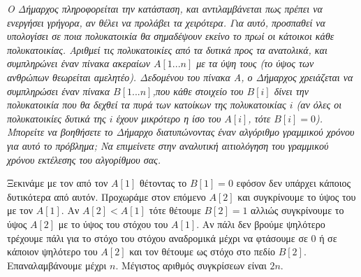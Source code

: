 \documentclass[a4paper,10pt]{article} \usepackage{anysize}
\begin{document}
\textit{Ο Δήμαρχος πληροφορείται την κατάσταση, και αντιλαμβάνεται πως πρέπει
να ενεργήσει γρήγορα, αν θέλει να προλάβει τα χειρότερα. Για αυτό, προσπαθεί
να υπολογίσει σε ποια πολυκατοικία θα σημαδέψουν εκείνο το πρωί οι κάτοικοι
κάθε πολυκατοικίας. Αριθμεί τις πολυκατοικίες από τα δυτικά προς τα ανατολικά,
και συμπληρώνει έναν πίνακα ακεραίων $A[1...n]$ με τα ύψη τους (το ύψος των
ανθρώπων θεωρείται αμελητέο). Δεδομένου του πίνακα Α, ο Δήμαρχος χρειάζεται να
συμπληρώσει έναν πίνακα $B[1...n]$,που κάθε στοιχείο του $B[i]$ δίνει την
πολυκατοικία που θα δεχθεί τα πυρά των κατοίκων της πολυκατοικίας $i$ (αν όλες
οι πολυκατοικίες δυτικά της $i$ έχουν μικρότερο η ίσο του $A[i]$, τότε
$B[i]=0$). Μπορείτε να βοηθήσετε το Δήμαρχο διατυπώνοντας έναν αλγόριθμο
γραμμικού χρόνου για αυτό το πρόβλημα; Να επιμείνετε στην αναλυτική
αιτιολόγηση του γραμμικού χρόνου εκτέλεσης του αλγορίθμου σας.} \vspace{0.4cm}

Ξεκινάμε με τον από τον $A[1]$ θέτοντας το $B[1]=0$ εφόσον δεν υπάρχει κάποιος
δυτικότερα από αυτόν. Προχωράμε στον επόμενο $A[2]$ και συγκρίνουμε το ύψος
του με τον $A[1]$. Αν $A[2]<A[1]$ τότε θέτουμε $B[2]=1$ αλλιώς συγκρίνουμε το
ύψος $A[2]$ με το ύψος του στόχου του $A[1]$. Αν πάλι δεν βρούμε ψηλότερο
τρέχουμε πάλι για το στόχο του στόχου αναδρομικά μέχρι να φτάσουμε σε 0
ή σε κάποιον ψηλότερο του $A[2]$ και τον θέτουμε ως στόχο στο πεδίο $B[2]$.
Επαναλαμβάνουμε μέχρι $n$. Μέγιστος αριθμός συγκρίσεων είναι $2n$.
\end{document}
